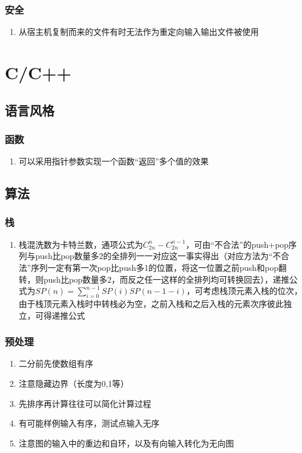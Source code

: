 \documentclass[onecolumn]{article}
\begin{document}
        \subsubsection{安全}
            \noindent
            \begin{enumerate}
                \item 从宿主机复制而来的文件有时无法作为重定向输入输出文件被使用
            \end{enumerate}
\newpage
\section{C/C++}
    \subsection{语言风格}
        \subsubsection{函数}
            \noindent
            \begin{enumerate}
                \item 可以采用指针参数实现一个函数“返回”多个值的效果
            \end{enumerate}
    \subsection{算法}
        \subsubsection{栈}
            \noindent
            \begin{enumerate}
                \item 栈混洗数为卡特兰数，通项公式为$C_{2n}^n-C_{2n}^{n-1}$，可由“不合法”的push+pop序列与push比pop数量多2的全排列一一对应这一事实得出（对应方法为“不合法”序列一定有第一次pop比push多1的位置，将这一位置之前push和pop翻转，则push比pop数量多2，而反之任一这样的全排列均可转换回去），递推公式为$SP(n)=\sum_{i=0}^{n-1}SP(i)SP(n-1-i)$，可考虑栈顶元素入栈的位次，由于栈顶元素入栈时中转栈必为空，之前入栈和之后入栈的元素次序彼此独立，可得递推公式
            \end{enumerate}
        \subsubsection{预处理}
            \noindent
            \begin{enumerate}
                \item 二分前先使数组有序
                \item 注意隐藏边界（长度为0,1等）
                \item 先排序再计算往往可以简化计算过程
                \item 有可能样例输入有序，测试点输入无序
                \item 注意图的输入中的重边和自环，以及有向输入转化为无向图
            \end{enumerate}
\end{document}
